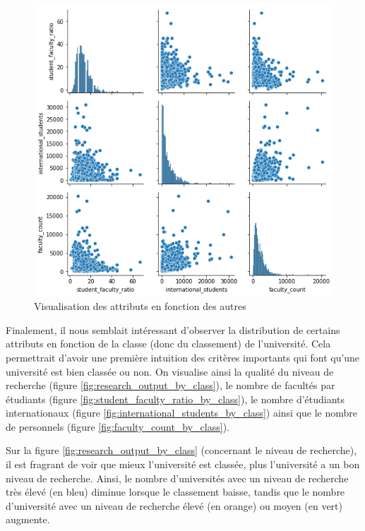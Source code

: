 \documentclass[twocolumns]{udes_rapport}
\begin{document}
    \begin{figure}[h!]
        \centering
        \includegraphics[scale=0.4]{Images/pairgrid.png}
        \caption{Visualisation des attributs en fonction des autres}
        \label{fig:pairgrid}
    \end{figure}
    
    Finalement, il nous semblait intéressant d'observer la distribution de certains attributs en fonction de la classe (donc du classement) de l'université. Cela permettrait d'avoir une première intuition des critères importants qui font qu'une université est bien classée ou non. On visualise ainsi la qualité du niveau de recherche (figure \ref{fig:research_output_by_class}), le nombre de facultés par étudiants (figure \ref{fig:student_faculty_ratio_by_class}), le nombre d'étudiants internationaux (figure \ref{fig:international_students_by_class}) ainsi que le nombre de personnels (figure \ref{fig:faculty_count_by_class}).
    
    Sur la figure \ref{fig:research_output_by_class} (concernant le niveau de recherche), il est fragrant de voir que mieux l'université est classée, plus l'université a un bon niveau de recherche. Ainsi, le nombre d'universités avec un niveau de recherche très élevé (en bleu) diminue lorsque le classement baisse, tandis que le nombre d'université avec un niveau de recherche élevé (en orange) ou moyen (en vert) augmente.
    
\end{document}
